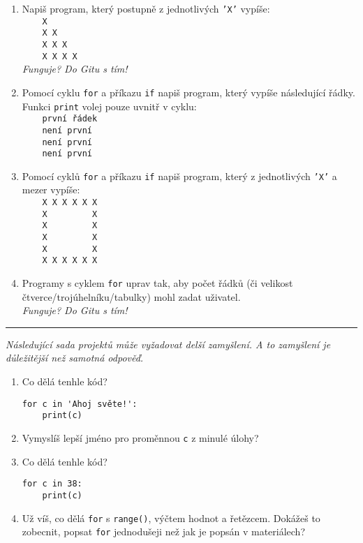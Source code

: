 \documentclass[a4paper,10pt]{article}
\newcommand\startsection[1]{
     \vspace{0.2ex}
    \hrule
    {\fontspec{Oxygen} \tiny
     \vspace{-1ex}
     \emph{#1}
     \vspace{-1.5em}
    }
}
\begin{document}
\begin{enumerate}[resume]
\item Napiš program, který postupně z jednotlivých \texttt{'X'} vypíše:
\\\verb+    X+
\\\verb+    X X+
\\\verb+    X X X+
\\\verb+    X X X X+
    \\\emph{\small Funguje? Do Gitu s tím!}

\item Pomocí cyklu \verb+for+ a příkazu \verb+if+ napiš program, který vypíše následující řádky. Funkci \texttt{print} volej pouze uvnitř v cyklu:
\\\verb+    první řádek+
\\\verb+    není první+
\\\verb+    není první+
\\\verb+    není první+

\item Pomocí cyklů \verb+for+ a příkazu \verb+if+ napiš program,
    který z jednotlivých \texttt{'X'} a mezer vypíše:
\\\verb+    X X X X X X+
\\\verb+    X         X+
\\\verb+    X         X+
\\\verb+    X         X+
\\\verb+    X         X+
\\\verb+    X X X X X X+

\item Programy s cyklem \verb+for+ uprav tak, aby počet řádků
    (či velikost čtverce/trojúhelníku/tabulky)
    mohl zadat uživatel.
    \\\emph{\small Funguje? Do Gitu s tím!}

\end{enumerate}

\startsection{Následující sada projektů může vyžadovat delší zamyšlení. A to zamyšlení je důležitější než samotná odpověď.}

\begin{enumerate}[resume]
\item Co dělá tenhle kód?
\begin{verbatim}
for c in 'Ahoj světe!':
    print(c)
\end{verbatim}

\item Vymyslíš lepší jméno pro proměnnou \verb+c+ z minulé úlohy?

\item Co dělá tenhle kód?
\begin{verbatim}
for c in 38:
    print(c)
\end{verbatim}

\item Už víš, co dělá \texttt{for} s \texttt{range()}, výčtem hodnot a řetězcem.
    Dokážeš to zobecnit, popsat \texttt{for} jednodušeji než jak je popsán v materiálech?

\end{enumerate}
\end{document}
